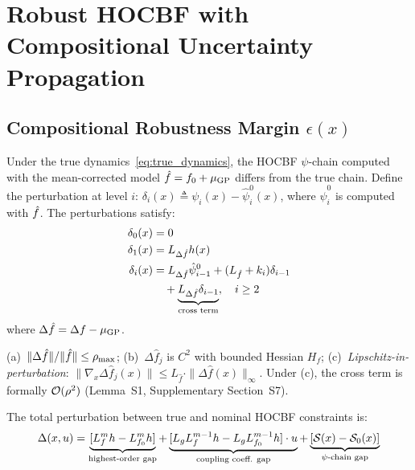 \section{Robust HOCBF with Compositional Uncertainty Propagation}
\label{sec:robust_hocbf}

\subsection{Compositional Robustness Margin $\epsilon(x)$}

Under the true dynamics~\eqref{eq:true_dynamics}, the HOCBF $\psi$-chain computed with the mean-corrected model $\hat{f} = f_0 + \mu_{\mathrm{GP}}$ differs from the true chain. Define the perturbation at level $i$: $\delta_i(x) \triangleq \psi_i(x) - \hat{\psi}_i^0(x)$, where $\hat{\psi}_i^0$ is computed with $\hat{f}$. The perturbations satisfy:
\begin{align}
    \delta_0(x) &= 0 \label{eq:delta0} \\
    \delta_1(x) &= L_{\Delta \hat{f}} h(x) \label{eq:delta1} \\
    \delta_i(x) &= L_{\Delta \hat{f}} \hat{\psi}_{i-1}^0 + (L_{\hat{f}} + k_i) \delta_{i-1} \nonumber\\
                &\quad + \underbrace{L_{\Delta \hat{f}} \delta_{i-1}}_{\text{cross term}}, \quad i \geq 2 \label{eq:delta_recursive}
\end{align}
where $\Delta \hat{f} = \Delta f - \mu_{\mathrm{GP}}$.

\begin{assumption}
\label{asm:small_perturbation}
(a)~$\|\Delta \hat{f}\| / \|\hat{f}\| \leq \rho_{\max}$; (b)~$\Delta \hat{f}_j$ is $C^2$ with bounded Hessian $H_f$; (c)~\emph{Lipschitz-in-perturbation}: $\|\nabla_x \Delta \hat{f}_j(x)\| \leq L_{\hat{f}} \cdot \|\Delta \hat{f}(x)\|_\infty$. Under (c), the cross term is formally $\mathcal{O}(\rho^2)$ (Lemma~S1, Supplementary Section~S7).
\end{assumption}

The total perturbation between true and nominal HOCBF constraints is:
\begin{equation}
    \Delta(x, u) = \underbrace{[L_f^m h - L_{f_0}^m h]}_{\text{highest-order gap}} + \underbrace{[L_g L_f^{m-1} h - L_g L_{f_0}^{m-1} h] \cdot u}_{\text{coupling coeff. gap}} + \underbrace{[\mathcal{S}(x) - \mathcal{S}_0(x)]}_{\psi\text{-chain gap}}
    \label{eq:total_perturbation}
\end{equation}

